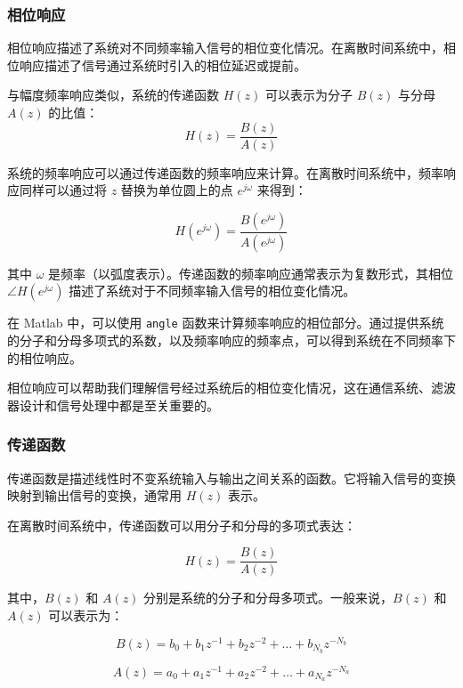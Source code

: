\documentclass[a4paper,12pt]{article}
\begin{document}
\subsubsection{相位响应}

相位响应描述了系统对不同频率输入信号的相位变化情况。在离散时间系统中，相位响应描述了信号通过系统时引入的相位延迟或提前。

与幅度频率响应类似，系统的传递函数 \( H(z) \) 可以表示为分子 \( B(z) \) 与分母 \( A(z) \) 的比值：
\begin{equation}
H(z) = \frac{B(z)}{A(z)}
\end{equation}

系统的频率响应可以通过传递函数的频率响应来计算。在离散时间系统中，频率响应同样可以通过将 \( z \) 替换为单位圆上的点 \( e^{j\omega} \) 来得到：

\begin{equation}
H(e^{j\omega}) = \frac{B(e^{j\omega})}{A(e^{j\omega})}
\end{equation}

其中 \( \omega \) 是频率（以弧度表示）。传递函数的频率响应通常表示为复数形式，其相位 \( \angle H(e^{j\omega}) \) 描述了系统对于不同频率输入信号的相位变化情况。

在 Matlab 中，可以使用 \texttt{angle} 函数来计算频率响应的相位部分。通过提供系统的分子和分母多项式的系数，以及频率响应的频率点，可以得到系统在不同频率下的相位响应。

相位响应可以帮助我们理解信号经过系统后的相位变化情况，这在通信系统、滤波器设计和信号处理中都是至关重要的。

\subsubsection{传递函数}
传递函数是描述线性时不变系统输入与输出之间关系的函数。它将输入信号的变换映射到输出信号的变换，通常用 \( H(z) \) 表示。

在离散时间系统中，传递函数可以用分子和分母的多项式表达：

\begin{equation}
H(z) = \frac{B(z)}{A(z)}
\end{equation}

其中，\( B(z) \) 和 \( A(z) \) 分别是系统的分子和分母多项式。一般来说，\( B(z) \) 和 \( A(z) \) 可以表示为：

\[ B(z) = b_0 + b_1 z^{-1} + b_2 z^{-2} + \ldots + b_{N_b} z^{-N_b} \]

\[ A(z) = a_0 + a_1 z^{-1} + a_2 z^{-2} + \ldots + a_{N_a} z^{-N_a} \]
\end{document}
